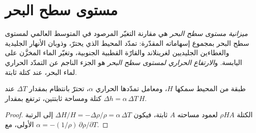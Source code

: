\begin{omfigure}
\par{}
\end{omfigure}


\section{مستوى سطح البحر}\label{sec:b2:anthropogenic-climate-change:sea-level}

\begin{definition}\label{def:b2:anthropogenic-climate-change:sea-level}
\emph{ميزانية مستوى سطح البحر} هي مقارنة التغيّر المرصود في
المتوسط العالمي لمستوى سطح البحر بمجموع إسهاماته المقدّرة: تمدّد المحيط
الذي يحترّ، وذوبان الأنهار الجليدية والغطاءين الجليديين لغرينلاند والقارّة القطبية الجنوبية، وتغيّر
الماء المخزَّن على اليابسة. و\emph{الارتفاع الحراري لمستوى سطح البحر} هو
الجزء الناجم عن التمدّد الحراري لماء البحر، عند كتلة ثابتة.
\end{definition}

\begin{proposition}\label{prop:b2:anthropogenic-climate-change:thermosteric}
طبقة من المحيط سمكها $H$، ومعامل تمدّدها الحراري $\alpha$، تحترّ بانتظام
بمقدار $\Delta T$ عند كتلة ومساحة ثابتتين، ترتفع بمقدار $\Delta h = \alpha\,\Delta T\,H$.
\end{proposition}
\begin{proof}
الكتلة $\rho H A$ لعمود مساحته $A$ ثابتة، فيكون $\Delta H/H = -\Delta\rho/\rho =
\alpha\,\Delta T$ إلى الرتبة الأولى، مع $\alpha = -(1/\rho)\,\partial\rho/\partial T$.
\end{proof}


